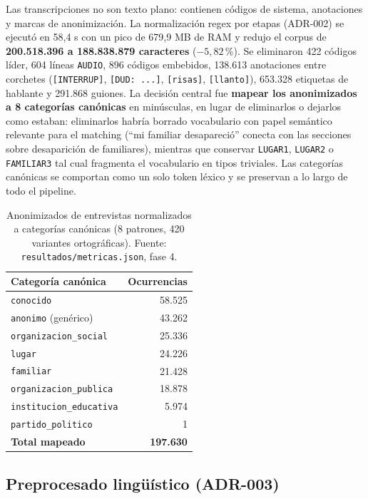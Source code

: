 \documentclass[11pt]{tg_usta}
\begin{document}
Las transcripciones no son texto plano: contienen códigos de sistema, anotaciones y marcas de anonimización. La normalización regex por etapas (ADR-002) se ejecutó en 58,4 s con un pico de 679,9 MB de RAM y redujo el corpus de \textbf{200.518.396 a 188.838.879 caracteres} ($-5{,}82$\,\%). Se eliminaron 422 códigos líder, 604 líneas \texttt{AUDIO}, 896 códigos embebidos, 138.613 anotaciones entre corchetes (\texttt{[INTERRUP]}, \texttt{[DUD: ...]}, \texttt{[risas]}, \texttt{[llanto]}), 653.328 etiquetas de hablante y 291.868 guiones. La decisión central fue \textbf{mapear los anonimizados a 8 categorías canónicas} en minúsculas, en lugar de eliminarlos o dejarlos como estaban: eliminarlos habría borrado vocabulario con papel semántico relevante para el matching (``mi familiar desapareció'' conecta con las secciones sobre desaparición de familiares), mientras que conservar \texttt{LUGAR1}, \texttt{LUGAR2} o \texttt{FAMILIAR3} tal cual fragmenta el vocabulario en tipos triviales. Las categorías canónicas se comportan como un solo token léxico y se preservan a lo largo de todo el pipeline.

\begin{table}[H]
    \centering
    \caption{Anonimizados de entrevistas normalizados a categorías canónicas (8 patrones, 420 variantes ortográficas). Fuente: \texttt{resultados/metricas.json}, fase 4.}
    \small
    \setlength{\tabcolsep}{6pt}
    \begin{tabular}{l r}
    \toprule
    Categoría canónica & Ocurrencias \\
    \midrule
    \texttt{conocido} & 58.525 \\
    \texttt{anonimo} (genérico) & 43.262 \\
    \texttt{organizacion\_social} & 25.336 \\
    \texttt{lugar} & 24.226 \\
    \texttt{familiar} & 21.428 \\
    \texttt{organizacion\_publica} & 18.878 \\
    \texttt{institucion\_educativa} & 5.974 \\
    \texttt{partido\_politico} & 1 \\
    \midrule
    \textbf{Total mapeado} & \textbf{197.630} \\
    \bottomrule
    \end{tabular}
    \label{tab:anonimizados}
\end{table}

\subsection{Preprocesado lingüístico (ADR-003)}
\end{document}
